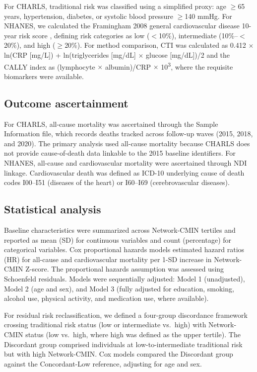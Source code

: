 \documentclass[11pt,a4paper]{article}
\begin{document}
For CHARLS, traditional risk was classified using a simplified proxy: age $\geq$65 years, hypertension, diabetes, or systolic blood pressure $\geq$140 mmHg. For NHANES, we calculated the Framingham 2008 general cardiovascular disease 10-year risk score \cite{dagostino2008framingham}, defining risk categories as low ($<$10\%), intermediate (10\%--$<$20\%), and high ($\geq$20\%). For method comparison, CTI was calculated as 0.412 $\times$ ln(CRP [mg/L]) + ln(triglycerides [mg/dL] $\times$ glucose [mg/dL])/2 and the CALLY index as (lymphocyte $\times$ albumin)/CRP $\times$ 10\textsuperscript{3}, where the requisite biomarkers were available.

\subsection{Outcome ascertainment}

For CHARLS, all-cause mortality was ascertained through the Sample Information file, which records deaths tracked across follow-up waves (2015, 2018, and 2020). The primary analysis used all-cause mortality because CHARLS does not provide cause-of-death data linkable to the 2015 baseline identifiers. For NHANES, all-cause and cardiovascular mortality were ascertained through NDI linkage. Cardiovascular death was defined as ICD-10 underlying cause of death codes I00--I51 (diseases of the heart) or I60--I69 (cerebrovascular diseases).

\subsection{Statistical analysis}

Baseline characteristics were summarized across Network-CMIN tertiles and reported as mean (SD) for continuous variables and count (percentage) for categorical variables. Cox proportional hazards models estimated hazard ratios (HR) for all-cause and cardiovascular mortality per 1-SD increase in Network-CMIN Z-score. The proportional hazards assumption was assessed using Schoenfeld residuals. Models were sequentially adjusted: Model 1 (unadjusted), Model 2 (age and sex), and Model 3 (fully adjusted for education, smoking, alcohol use, physical activity, and medication use, where available).

For residual risk reclassification, we defined a four-group discordance framework crossing traditional risk status (low or intermediate vs.\ high) with Network-CMIN status (low vs.\ high, where high was defined as the upper tertile). The Discordant group comprised individuals at low-to-intermediate traditional risk but with high Network-CMIN. Cox models compared the Discordant group against the Concordant-Low reference, adjusting for age and sex.
\end{document}
